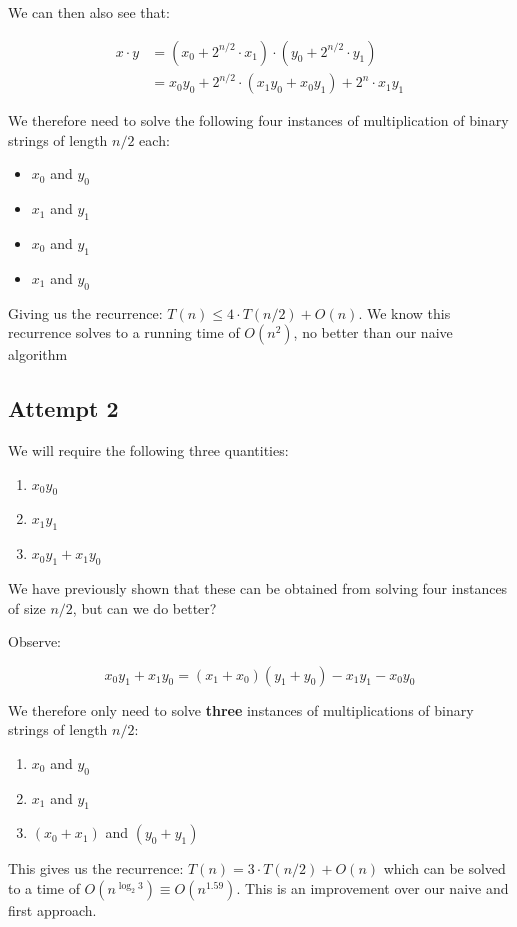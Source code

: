 \documentclass{article}
\begin{document}
We can then also see that:

\begin{align*}
  x\cdot y &= (x_{0} + 2^{n/2} \cdot x_{1})\cdot (y_{0} + 2^{n/2}\cdot y_{1}) \\
  &= x_{0}y_{0} + 2^{n/2} \cdot (x_{1}y_{0}+x_{0}y_{1}) + 2^{n} \cdot x_{1}y_{1}
\end{align*}

We therefore need to solve the following four instances of multiplication of binary strings of length $n/2$ each:

\begin{itemize}
  \item $x_{0}$ and $y_{0}$
  \item $x_{1}$ and $y_{1}$
  \item $x_{0}$ and $y_{1}$
  \item $x_{1}$ and $y_{0}$
\end{itemize}

Giving us the recurrence: $T(n) \leq 4\cdot T(n/2) + O(n)$. We know this recurrence solves to a running time of $O(n^{2})$, no better than our naive algorithm

\subsection{Attempt 2}

We will require the following three quantities:

\begin{enumerate}
  \item $x_{0}y_{0}$

  \item $x_{1}y_{1}$
  \item $x_{0}y_{1} + x_{1}y_{0}$
\end{enumerate}

We have previously shown that these can be obtained from solving four instances of size $n/2$, but can we do better?

Observe:

\[
  x_{0}y_{1} + x_{1}y_{0} = (x_{1} + x_{0})(y_{1}+ y_{0}) - x_{1}y_{1} - x_{0}y_{0}
\]

We therefore only need to solve \textbf{three} instances of multiplications of binary strings of length $n/2$:

\begin{enumerate}
  \item $x_{0}$ and $y_{0}$

  \item $x_{1}$ and $y_{1}$

  \item $(x_{0} + x_{1}) $ and $(y_{0} + y_{1})$
\end{enumerate}

This gives us the recurrence: $T(n)= 3\cdot T(n/2) + O(n)$ which can be solved to a time of $O(n^{\log_{2} 3}) \equiv O(n^{1.59})$. This is an improvement over our naive and first approach.
\end{document}
